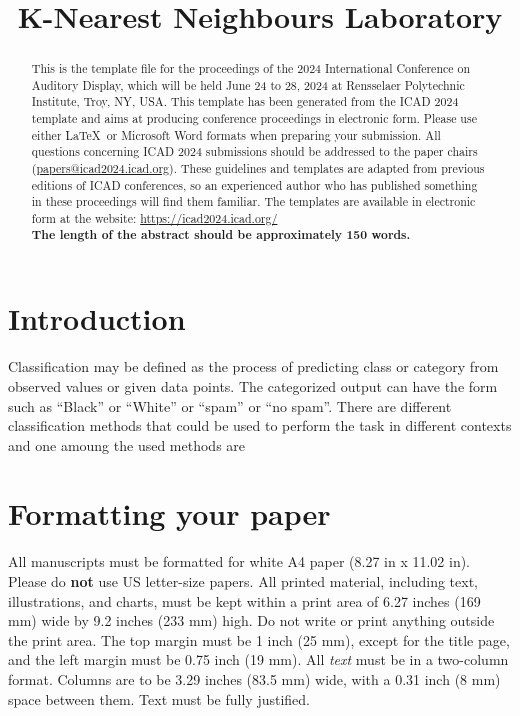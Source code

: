 \documentclass[a4paper,10pt,oneside]{article}
\title{K-Nearest Neighbours Laboratory}
\begin{document}
\ninept
\maketitle
\begin{sloppy}
\begin{abstract}
This is the template file for the proceedings of the 2024 International Conference on Auditory Display, which will be held June 24 to 28, 2024 at Rensselaer Polytechnic Institute, Troy, NY, USA. This template has been generated from the ICAD 2024 template and aims at producing conference proceedings in electronic form. Please use either \LaTeX\ or Microsoft Word formats when preparing your submission. All questions concerning ICAD 2024 submissions should be addressed to the paper chairs (\href{mailto:papers@icad2024.icad.org}{papers@icad2024.icad.org}). These guidelines and templates are adapted from previous editions of ICAD conferences, so an experienced author who has published something in these proceedings will find them familiar. The templates are available in electronic form at the website: \url{https://icad2024.icad.org/}\\
\bf{The length of the abstract should be approximately 150 words.}
\end{abstract}

\section{Introduction}
\label{sec:intro}

Classification may be defined as the process of predicting class or category from observed values or given data points. The categorized output can have the form such as “Black” or “White” or “spam” or “no spam”.
There are different classification methods that could be used to perform the task in different contexts and one amoung the used methods are  
\section{Formatting your paper}
\label{sec:format}

All manuscripts must be formatted for white A4 paper (8.27 in x 11.02 in). Please do \textbf{not} use US letter-size papers. All printed material, including text, illustrations, and charts, must be kept within a print area of 6.27 inches (169 mm) wide by 9.2 inches (233 mm) high. Do not write or print anything outside the print area. The top margin must be 1 inch (25 mm), except for the title page, and the left margin must be 0.75 inch (19 mm). All \textit{text} must be in a two-column format. Columns are to be 3.29 inches (83.5 mm) wide, with a 0.31 inch (8 mm) space between them. Text must be fully justified.


\end{sloppy}
\end{document}
